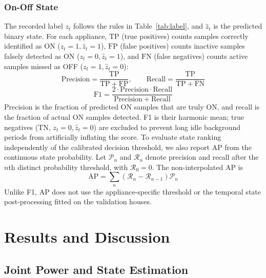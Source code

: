 \documentclass[journal]{IEEEtran}
\begin{document}
\subsubsection{On-Off State}
The recorded label $z_t$ follows the rules in Table~\ref{tab:label}, and $\hat{z}_t$ is the predicted binary state. For each appliance, $\mathrm{TP}$ (true positives) counts samples correctly identified as ON ($z_t=1, \hat{z}_t=1$), $\mathrm{FP}$ (false positives) counts inactive samples falsely detected as ON ($z_t=0, \hat{z}_t=1$), and $\mathrm{FN}$ (false negatives) counts active samples missed as OFF ($z_t=1, \hat{z}_t=0$):
\begin{equation}
\mathrm{Precision}=\frac{\mathrm{TP}}{\mathrm{TP}+\mathrm{FP}},\qquad
\mathrm{Recall}=\frac{\mathrm{TP}}{\mathrm{TP}+\mathrm{FN}}
\label{eq:precision}
\end{equation}
\begin{equation}
\mathrm{F1}=\frac{2\cdot\mathrm{Precision}\cdot\mathrm{Recall}}{\mathrm{Precision}+\mathrm{Recall}}
\label{eq:f1}
\end{equation}
Precision is the fraction of predicted ON samples that are truly ON, and recall is the fraction of actual ON samples detected. F1 is their harmonic mean; true negatives ($\mathrm{TN}$, $z_t=0, \hat{z}_t=0$) are excluded to prevent long idle background periods from artificially inflating the score.
To evaluate state ranking independently of the calibrated decision threshold, we also report AP from the continuous state probability. Let $\mathcal{P}_n$ and $\mathcal{R}_n$ denote precision and recall after the $n$th distinct probability threshold, with $\mathcal{R}_0=0$. The non-interpolated AP is
\begin{equation}
\mathrm{AP}=\sum_n\left(\mathcal{R}_n-\mathcal{R}_{n-1}\right)\mathcal{P}_n
\label{eq:average-precision}
\end{equation}
Unlike F1, AP does not use the appliance-specific threshold or the temporal state post-processing fitted on the validation houses.

\section{Results and Discussion}

\subsection{Joint Power and State Estimation}
\label{sec:power-state}
\end{document}
